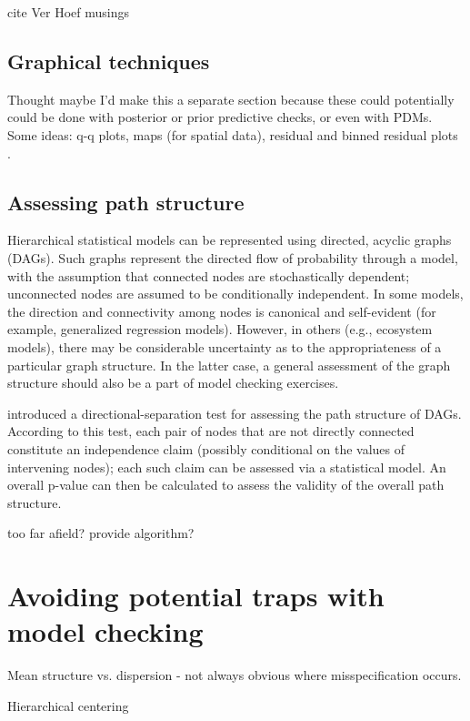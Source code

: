 \documentclass[12pt,english]{article}
\begin{document}
\begin{spacing}{1.9}
cite Ver Hoef musings

\subsection{Graphical techniques}

Thought maybe I'd make this a separate section because these could potentially could be done with posterior or prior predictive checks, or even with PDMs.  Some ideas: q-q plots, maps (for spatial data), residual and binned residual plots \citep{GelmanEtAl2014}.



\subsection{Assessing path structure}

Hierarchical statistical models can be represented using directed, acyclic graphs (DAGs).  Such graphs represent the directed flow of probability through a model, with the assumption that connected nodes are stochastically dependent; unconnected nodes are assumed to be conditionally independent.  In some models, the direction and connectivity among nodes is canonical and self-evident (for example, generalized regression models).  However, in others (e.g., ecosystem models), there may be considerable uncertainty as to the appropriateness of a particular graph structure.  In the latter case, a general assessment of the graph structure should also be a part of model checking exercises.

\citet{Shipley2009} introduced a directional-separation test for assessing the path structure of DAGs.  According to this test, each pair of nodes that are not directly connected constitute an independence claim (possibly conditional on the values of intervening nodes); each such claim can be assessed via a statistical model.  An overall p-value can then be calculated to assess the validity of the overall path structure.

too far afield?
provide algorithm?


\section{Avoiding potential traps with model checking}

Mean structure vs. dispersion - not always obvious where misspecification occurs.

Hierarchical centering


\end{spacing}
\end{document}
